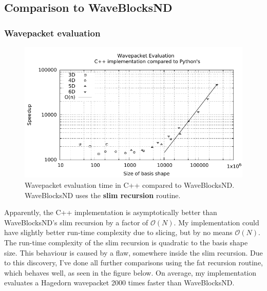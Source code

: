 \documentclass{article}
\begin{document}
\subsection{Comparison to WaveBlocksND}

\subsubsection{Wavepacket evaluation}

\begin{figure}[H]
  \centering
  \includegraphics[width=1.0\textwidth]{plots/hawp_eval_cvp_slim}
  \caption{Wavepacket evaluation time in C++ compared to WaveBlocksND.
    WaveBlocksND uses the \textbf{slim recursion} routine.}
  \label{fig:hawp_eval_cvp_slim}
\end{figure}

Apparently, the C++ implementation is asymptotically better than
WaveBlocksND's slim recursion by a factor of \(\mathcal{O}(N)\).
My implementation could have slightly better run-time complexity due to slicing, but by
no means \(\mathcal{O}(N)\). The run-time complexity of the slim recursion is
quadratic to the basis shape size.
This behaviour is caused by a flaw, somewhere inside the slim recursion.
Due to this discovery, I've done all further comparisons using the fat recursion routine,
which behaves well, as seen in the figure below. On average, my implementation evaluates a
Hagedorn wavepacket 2000 times faster than WaveBlocksND.
\end{document}
